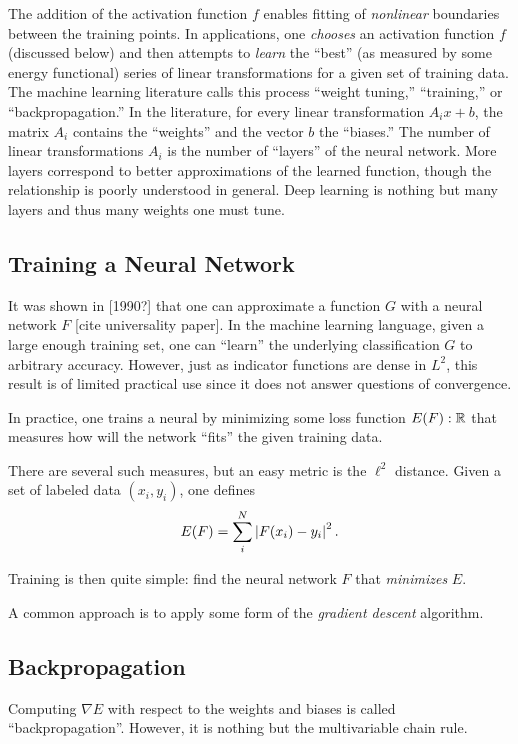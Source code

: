 \documentclass[12pt,letterpaper,boxed]{article}
\begin{document}
	The addition of the activation function $f$ enables fitting of \textit{nonlinear} boundaries between the training points. In applications, one \textit{chooses} an activation function $f$ (discussed below) and then attempts to \textit{learn} the ``best'' (as measured by some energy functional) series of linear transformations for a given set of training data. The machine learning literature calls this process ``weight tuning,'' ``training,'' or ``backpropagation.'' In the literature, for every linear transformation $A_i x + b$, the matrix $A_i$ contains the ``weights'' and the vector $b$ the ``biases.'' The number of linear transformations $A_i$ is the number of ``layers'' of the neural network. More layers correspond to better approximations of the learned function, though the relationship is poorly understood in general. Deep learning is nothing but many layers and thus many weights one must tune.
	
	\subsection{Training a Neural Network}
	It was shown in [1990?] that one can approximate a function $G$ with a neural network $F$ [cite universality paper]. In the machine learning language, given a large enough training set, one can ``learn'' the underlying classification $G$ to arbitrary accuracy. However, just as indicator functions are dense in $L^2$, this result is of limited practical use since it does not answer questions of convergence.

	In practice, one trains a neural by minimizing some loss function $E(F) : {\mathbb{R}}$ that measures how will the network ``fits'' the given training data.

	There are several such measures, but an easy metric is the $\ell^2$ distance. Given a set of labeled data $(x_i, y_i)$, one defines
	\[
		E(F) = \sum_i^N \left| F(x_i) - y_i \right|^2.
	\]

	Training is then quite simple: find the neural network $F$ that \textit{minimizes} $E$.

	A common approach is to apply some form of the \textit{gradient descent} algorithm.
		\subsection{Backpropagation}
		Computing $\nabla E$ with respect to the weights and biases is called ``backpropagation''. However, it is nothing but the multivariable chain rule. 
\end{document}
